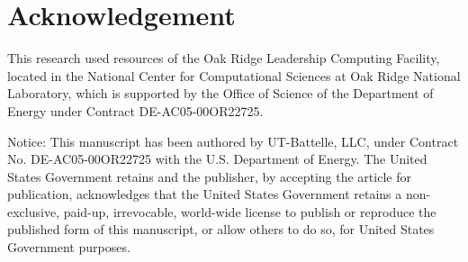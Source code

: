 \section{Acknowledgement}

This research used resources of the Oak Ridge Leadership Computing Facility,
located in the National Center for Computational Sciences at Oak Ridge National
Laboratory, which is supported by the Office of Science of the Department of
Energy under Contract DE-AC05-00OR22725.

Notice: This manuscript has been authored by UT-Battelle, LLC, under Contract
No. DE-AC05-00OR22725 with the U.S. Department of Energy. The United States
Government retains and the publisher, by accepting the article for publication,
acknowledges that the United States Government retains a non-exclusive,
paid-up, irrevocable, world-wide license to publish or reproduce the published
form of this manuscript, or allow others to do so, for United States Government
purposes.


